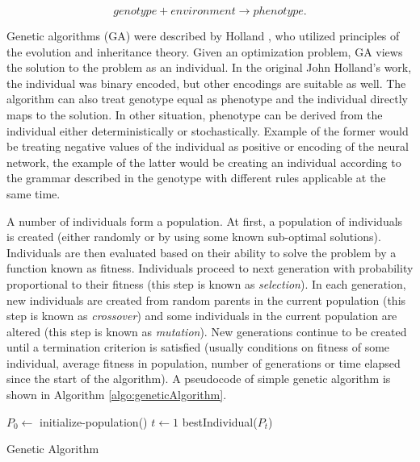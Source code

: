 \begin{equation*}
genotype + environment \rightarrow phenotype.
\end{equation*}

Genetic algorithms (GA) were described by Holland \cite{HollandGeneticAlgorithms}, who utilized principles of the evolution and inheritance theory. Given an optimization problem, GA views the solution to the problem as an individual. In the original John Holland’s work, the individual was binary encoded, but other encodings are suitable as well. The algorithm can also treat genotype equal as phenotype and the individual directly maps to the solution. In other situation, phenotype can be derived from the individual either deterministically or stochastically. Example of the former would be treating negative values of the individual as positive or encoding of the neural network, the example of the latter would be creating an individual according to the grammar described in the genotype with different rules applicable at the same time. 

A number of individuals form a population. At first, a population of individuals is created (either randomly or by using some known sub-optimal solutions). Individuals are then evaluated based on their ability to solve the problem by a function known as fitness. Individuals proceed to next generation with probability proportional to their fitness (this step is known as \emph{selection}). In each generation, new individuals are created from random parents in the current population (this step is known as \emph{crossover}) and some individuals in the current population are altered (this step is known as \emph{mutation}). New generations continue to be created until a termination criterion is satisfied (usually conditions on fitness of some individual, average fitness in population, number of generations or time elapsed since the start of the algorithm). A pseudocode of simple genetic algorithm is shown in Algorithm \ref{algo:geneticAlgorithm}.

\IncMargin{1em}
\begin{algorithm}
	\BlankLine
	$P_0 \leftarrow$ initialize-population()\;
	$t \leftarrow 1$\;
	\Return bestIndividual($P_t$)\;
	\caption{Genetic Algorithm}\label{algo:geneticAlgorithm}
\end{algorithm}\DecMargin{1em}

